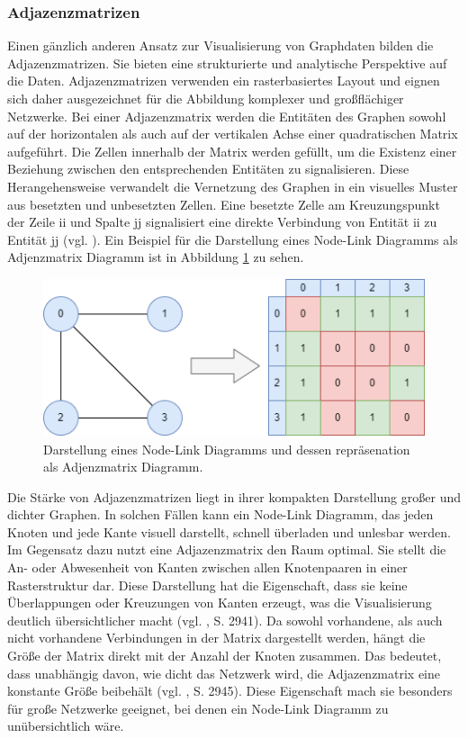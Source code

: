 \subsubsection{Adjazenzmatrizen}

Einen gänzlich anderen Ansatz zur Visualisierung von Graphdaten bilden die Adjazenzmatrizen. Sie bieten eine strukturierte und analytische Perspektive auf die Daten. Adjazenzmatrizen verwenden ein rasterbasiertes Layout und eignen sich daher ausgezeichnet für die Abbildung komplexer und großflächiger Netzwerke. Bei einer Adjazenzmatrix werden die Entitäten des Graphen sowohl auf der horizontalen als auch auf der vertikalen Achse einer quadratischen Matrix aufgeführt. Die Zellen innerhalb der Matrix werden gefüllt, um die Existenz einer Beziehung zwischen den entsprechenden Entitäten zu signalisieren. Diese Herangehensweise verwandelt die Vernetzung des Graphen in ein visuelles Muster aus besetzten und unbesetzten Zellen. Eine besetzte Zelle am Kreuzungspunkt der Zeile ii und Spalte jj signalisiert eine direkte Verbindung von Entität ii zu Entität jj (vgl. \cite{adjacencymatrix:Sauras}). Ein Beispiel für die Darstellung eines Node-Link Diagramms als Adjenzmatrix Diagramm ist in Abbildung \ref{fig:theory:vistechniques:adjacencymatrix} zu sehen.

\begin{figure}[h]
    \centering
    \includegraphics[height=.3\textwidth]{images/02/NodeLinkToAdjacency.drawio.png}
    \caption{Darstellung eines Node-Link Diagramms und dessen repräsenation als Adjenzmatrix Diagramm.}
    \label{fig:theory:vistechniques:adjacencymatrix}
\end{figure}

Die Stärke von Adjazenzmatrizen liegt in ihrer kompakten Darstellung großer und dichter Graphen. In solchen Fällen kann ein Node-Link Diagramm, das jeden Knoten und jede Kante visuell darstellt, schnell überladen und unlesbar werden. Im Gegensatz dazu nutzt eine Adjazenzmatrix den Raum optimal. Sie stellt die An- oder Abwesenheit von Kanten zwischen allen Knotenpaaren in einer Rasterstruktur dar. Diese Darstellung hat die Eigenschaft, dass sie keine Überlappungen oder Kreuzungen von Kanten erzeugt, was die Visualisierung deutlich übersichtlicher macht (vgl. \cite{adjacencyOrNode:Okoe}, S. 2941). Da sowohl vorhandene, als auch nicht vorhandene Verbindungen in der Matrix dargestellt werden, hängt die Größe der Matrix direkt mit der Anzahl der Knoten zusammen. Das bedeutet, dass unabhängig davon, wie dicht das Netzwerk wird, die Adjazenzmatrix eine konstante Größe beibehält (vgl. \cite{adjacencyOrNode:Okoe}, S. 2945). Diese Eigenschaft mach sie besonders für große Netzwerke geeignet, bei denen ein Node-Link Diagramm zu unübersichtlich wäre.

